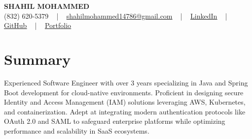 \documentclass[letterpaper,10pt]{article}
\begin{document}
\begin{center}
    {\fontsize{14pt}{12pt}\selectfont \textbf{\MakeUppercase{Shahil Mohammed}}}\\ \vspace{2pt}
    \fontsize{10pt}{12pt}\selectfont (832) 620-5379 ~ | ~ \href{mailto:shahilmohammed14786@gmail.com}{shahilmohammed14786@gmail.com} ~ | ~  
    \href{https://www.linkedin.com/in/shahil-mohammed-9652931a1/}{\color{blue}\underline{LinkedIn}}  ~ | ~ 
    \href{https://github.com/freakbeast14}{\color{blue}\underline{GitHub}} ~ | ~ 
    \href{https://shahil-mohammed.netlify.app/}{\color{blue}\underline{Portfolio}}
    \vspace{-8pt}
\end{center}

\section{Summary}
\vspace{-2pt}\fontsize{8pt}{9pt}\selectfont
Experienced Software Engineer with over 3 years specializing in Java and Spring Boot development for cloud-native environments. Proficient in designing secure Identity and Access Management (IAM) solutions leveraging AWS, Kubernetes, and containerization. Adept at integrating modern authentication protocols like OAuth 2.0 and SAML to safeguard enterprise platforms while optimizing performance and scalability in SaaS ecosystems.
 \vspace{-5pt}
 
\vspace{-2pt}
\end{document}

